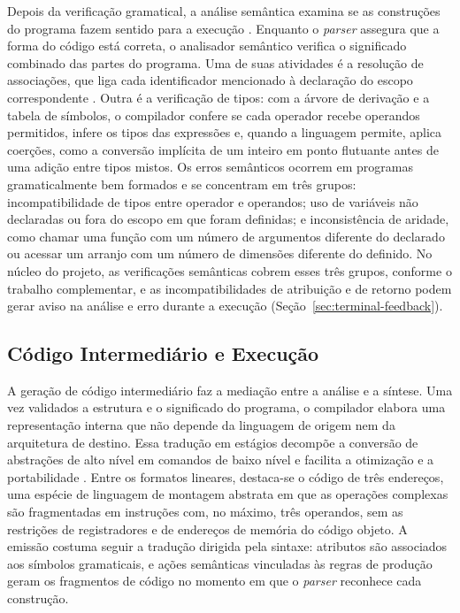 Depois da verificação gramatical, a análise semântica examina se as construções do programa fazem sentido para a execução \cite{price2001}. Enquanto o \textit{parser} assegura que a forma do código está correta, o analisador semântico verifica o significado combinado das partes do programa. Uma de suas atividades é a resolução de associações, que liga cada identificador mencionado à declaração do escopo correspondente \cite{nystrom2021}. Outra é a verificação de tipos: com a árvore de derivação e a tabela de símbolos, o compilador confere se cada operador recebe operandos permitidos, infere os tipos das expressões e, quando a linguagem permite, aplica coerções, como a conversão implícita de um inteiro em ponto flutuante antes de uma adição entre tipos mistos. Os erros semânticos ocorrem em programas gramaticalmente bem formados e se concentram em três grupos: incompatibilidade de tipos entre operador e operandos; uso de variáveis não declaradas ou fora do escopo em que foram definidas; e inconsistência de aridade, como chamar uma função com um número de argumentos diferente do declarado ou acessar um arranjo com um número de dimensões diferente do definido. No núcleo do projeto, as verificações semânticas cobrem esses três grupos, conforme o trabalho complementar, e as incompatibilidades de atribuição e de retorno podem gerar aviso na análise e erro durante a execução (Seção~\ref{sec:terminal-feedback}).

\subsection{Código Intermediário e Execução}

A geração de código intermediário faz a mediação entre a análise e a síntese. Uma vez validados a estrutura e o significado do programa, o compilador elabora uma representação interna que não depende da linguagem de origem nem da arquitetura de destino. Essa tradução em estágios decompõe a conversão de abstrações de alto nível em comandos de baixo nível e facilita a otimização e a portabilidade \cite{cooper2012,price2001}. Entre os formatos lineares, destaca-se o código de três endereços, uma espécie de linguagem de montagem abstrata em que as operações complexas são fragmentadas em instruções com, no máximo, três operandos, sem as restrições de registradores e de endereços de memória do código objeto. A emissão costuma seguir a tradução dirigida pela sintaxe: atributos são associados aos símbolos gramaticais, e ações semânticas vinculadas às regras de produção geram os fragmentos de código no momento em que o \textit{parser} reconhece cada construção.


